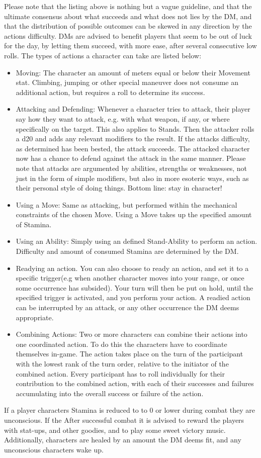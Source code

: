 \documentclass[a4paper,11pt]{article}
\begin{document}
Please note that the listing above is nothing but a vague guideline, and that the ultimate consensus about what succeeds and what does not lies by the DM, and that the distribution of possible outcomes can be skewed in any direction by the actions difficulty. DMs are advised to benefit players that seem to be out of luck for the day, by letting them succeed, with more ease, after several consecutive low rolls.
The types of actions a character can take are listed below:
\begin{itemize}
	\item Moving: The character an amount of meters equal or below their Movement stat. Climbing, jumping or other special maneuver does not consume an additional action, but requires a roll to determine its success.
	\item Attacking and Defending: Whenever a character tries to attack, their player say how they want to attack, e.g. with what weapon, if any, or where specifically on the target. This also applies to Stands. Then the attacker rolls a d20 and adds any relevant modifiers to the result. If the attacks difficulty, as determined has been bested, the attack succeeds. The attacked character now has a chance to defend against the attack in the same manner. Please note that attacks are argumented by abilities, strengths or weaknesses, not just in the form of simple modifiers, but also in more esoteric ways, such as their personal style of doing things. Bottom line: stay in character!
	\item Using a Move: Same as attacking, but performed within the mechanical constraints of the chosen Move. Using a Move takes up the specified amount of Stamina.
	\item Using an Ability: Simply using an defined Stand-Ability to perform an action. Difficulty and amount of consumed Stamina are determined by the DM.
	\item Readying an action. You can also choose to ready an action, and set it to a specific trigger(e.g when another character moves into your range, or once some occurrence has subsided). Your turn will then be put on hold, until the specified trigger is activated, and you perform your action. A readied action can be interrupted by an attack, or any other occurrence the DM deems appropriate.
	\item Combining Actions: Two or more characters can combine their actions into one coordinated action. To do this the characters have to coordinate themselves in-game. The action takes place on the turn of the participant with the lowest rank of the turn order, relative to the initiator of the combined action. Every participant has to roll individually for their contribution to the combined action, with each of their successes and failures accumulating into the overall success or failure of the action.
\end{itemize}
If a player characters Stamina is reduced to to 0 or lower during combat they are unconscious. If the
After successful combat it is advised to reward the players with stat-ups, and other goodies, and to play some sweet victory music. Additionally, characters are healed by an amount the DM deems fit, and any unconscious characters wake up. 
\end{document}
